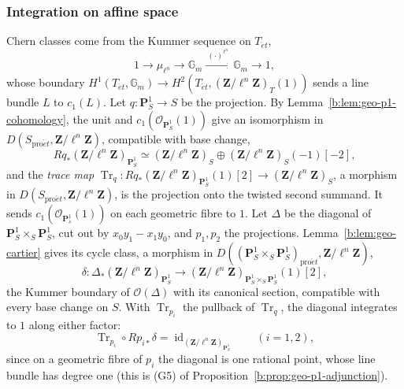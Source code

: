 \documentclass[11pt,a4paper]{article}
\numberwithin{equation}{section}
\theoremstyle{definition}
\theoremstyle{remark}
\newcommand{\et}{\acute{e}t}
\newcommand{\proet}{\mathrm{pro}\acute{e}t}
\begin{document}
\subsubsection{Integration on affine space}

Chern classes come from the Kummer sequence on $T_{\et}$,
\begin{equation}\label{eq:sp-kummer}
 1\longrightarrow\mu_{\ell^n}\longrightarrow\mathbb G_m
     \xrightarrow{\ (\cdot)^{\ell^n}\ }\mathbb G_m
     \longrightarrow1,
\end{equation}
whose boundary $H^1(T_{\et},\mathbb G_m)\to
H^2(T_{\et},(\mathbf Z/\ell^n\mathbf Z)_T(1))$ sends a line bundle $L$
to $c_1(L)$. Let $q:\mathbf P^1_S\to S$ be the projection. By
Lemma~\ref{b:lem:geo-p1-cohomology}, the unit and
$c_1(\mathcal O_{\mathbf P^1_S}(1))$ give an isomorphism in
$D(S_{\proet},\mathbf Z/\ell^n\mathbf Z)$, compatible with base change,
\begin{equation}\label{eq:sp-p1-splitting}
 Rq_*(\mathbf Z/\ell^n\mathbf Z)_{\mathbf P^1_S}
       \simeq(\mathbf Z/\ell^n\mathbf Z)_{S}\oplus(\mathbf Z/\ell^n\mathbf Z)_{S}(-1)[-2],
\end{equation}
and the \emph{trace map}
$\operatorname{Tr}_q:Rq_*(\mathbf Z/\ell^n\mathbf Z)_{\mathbf P^1_S}(1)[2]
\to(\mathbf Z/\ell^n\mathbf Z)_{S}$, a morphism in
$D(S_{\proet},\mathbf Z/\ell^n\mathbf Z)$, is the projection onto the twisted
second summand. It sends $c_1(\mathcal O_{\mathbf P^1_{\bar s}}(1))$ on
each geometric fibre to $1$. Let $\Delta$ be the diagonal of
$\mathbf P^1_S\times_S\mathbf P^1_S$, cut out by $x_0y_1-x_1y_0$, and
$p_1,p_2$ the projections. Lemma~\ref{b:lem:geo-cartier} gives its cycle
class, a morphism in
$D((\mathbf P^1_S\times_S\mathbf P^1_S)_{\proet},\mathbf Z/\ell^n\mathbf Z)$,
\[
 \delta:\Delta_*(\mathbf Z/\ell^n\mathbf Z)_{\mathbf P^1_S}
      \longrightarrow(\mathbf Z/\ell^n\mathbf Z)_{\mathbf P^1_S\times_S\mathbf P^1_S}(1)[2],
\]
the Kummer boundary of $\mathcal O(\Delta)$ with its canonical section,
compatible with every base change on $S$. With
$\operatorname{Tr}_{p_i}$ the pullback of $\operatorname{Tr}_q$, the
diagonal integrates to $1$ along either factor:
\begin{equation}\label{eq:sp-diagonal-integrals}
 \operatorname{Tr}_{p_i}\circ Rp_{i*}\delta
      =\operatorname{id}_{(\mathbf Z/\ell^n\mathbf Z)_{\mathbf P^1_S}}
 \qquad(i=1,2),
\end{equation}
since on a geometric fibre of $p_i$ the diagonal is one rational point,
whose line bundle has degree one (this is (G5) of
Proposition~\ref{b:prop:geo-p1-adjunction}).
\end{document}
